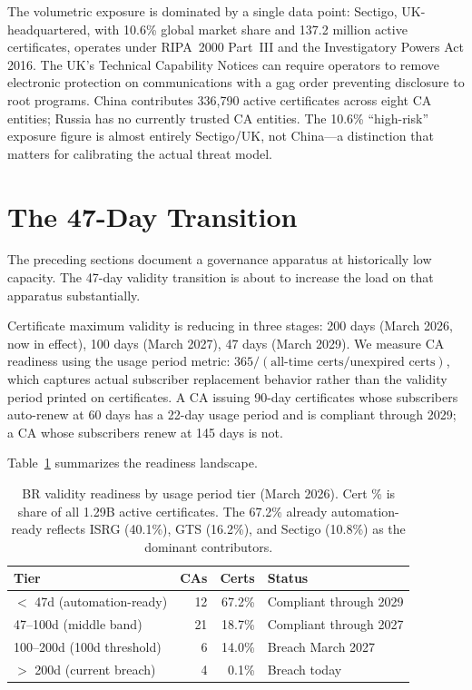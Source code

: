 \documentclass[10pt,twocolumn,letterpaper]{article}
\begin{document}
The volumetric exposure is dominated by a single data point: Sectigo,
UK-headquartered, with 10.6\% global market share and 137.2 million
active certificates, operates under RIPA~2000 Part~III and the
Investigatory Powers Act 2016. The UK's Technical Capability Notices
can require operators to remove electronic protection on communications
with a gag order preventing disclosure to root programs. China contributes
336,790 active certificates across eight CA entities; Russia has no
currently trusted CA entities. The 10.6\% ``high-risk'' exposure figure
is almost entirely Sectigo/UK, not China---a distinction that matters
for calibrating the actual threat model.

\section{The 47-Day Transition}
\label{sec:validity}

The preceding sections document a governance apparatus at historically low
capacity. The 47-day validity transition is about to increase the load on
that apparatus substantially.

Certificate maximum validity is reducing in three stages: 200 days
(March 2026, now in effect), 100 days (March 2027), 47 days (March 2029).
We measure CA readiness using the usage period metric: $365 /
(\text{all-time certs} / \text{unexpired certs})$, which captures actual
subscriber replacement behavior rather than the validity period printed
on certificates. A CA issuing 90-day certificates whose subscribers
auto-renew at 60 days has a 22-day usage period and is compliant through
2029; a CA whose subscribers renew at 145 days is not.

Table~\ref{tab:brready} summarizes the readiness landscape.

\begin{table}[t]
\centering
\footnotesize
\caption{BR validity readiness by usage period tier (March 2026).
Cert \% is share of all 1.29B active certificates. The 67.2\% already
automation-ready reflects ISRG (40.1\%), GTS (16.2\%), and Sectigo (10.8\%)
as the dominant contributors.}
\label{tab:brready}
\begin{tabularx}{\columnwidth}{@{}lrrl@{}}
\toprule
Tier & CAs & Certs & Status \\
\midrule
$<$ 47d (automation-ready) & 12 & 67.2\% & Compliant through 2029 \\
47--100d (middle band)     & 21 & 18.7\% & Compliant through 2027 \\
100--200d (100d threshold) &  6 & 14.0\% & Breach March 2027 \\
$>$ 200d (current breach)  &  4 &  0.1\% & Breach today \\
\bottomrule
\end{tabularx}
\end{table}
\end{document}
